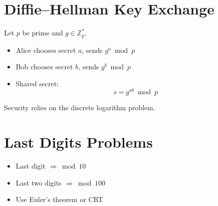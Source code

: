 \documentclass[11pt]{article}
\begin{document}
	
	\section*{Diffie--Hellman Key Exchange}
	
	Let $p$ be prime and $g \in \mathbb{Z}_p^\ast$.
	
	\begin{itemize}
		\item Alice chooses secret $a$, sends $g^a \bmod p$
		\item Bob chooses secret $b$, sends $g^b \bmod p$
		\item Shared secret:
		\[
		s = g^{ab} \bmod p
		\]
	\end{itemize}
	
	Security relies on the discrete logarithm problem.
	
	
	\section*{Last Digits Problems}
	
	\begin{itemize}
		\item Last digit $\Rightarrow \bmod 10$
		\item Last two digits $\Rightarrow \bmod 100$
		\item Use Euler's theorem or CRT
	\end{itemize}
	
\end{document}
